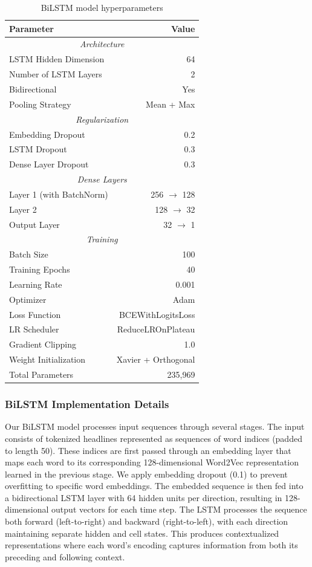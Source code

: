 \documentclass[11pt]{article}
\begin{document}
\begin{table}[h]
\centering
\begin{tabular}{lr}
\toprule
\textbf{Parameter} & \textbf{Value} \\
\midrule
\multicolumn{2}{c}{\textit{Architecture}} \\
LSTM Hidden Dimension & 64 \\
Number of LSTM Layers & 2 \\
Bidirectional & Yes \\
Pooling Strategy & Mean + Max \\
\midrule
\multicolumn{2}{c}{\textit{Regularization}} \\
Embedding Dropout & 0.2 \\
LSTM Dropout & 0.3 \\
Dense Layer Dropout & 0.3 \\
\midrule
\multicolumn{2}{c}{\textit{Dense Layers}} \\
Layer 1 (with BatchNorm) & 256 $\rightarrow$ 128 \\
Layer 2 & 128 $\rightarrow$ 32 \\
Output Layer & 32 $\rightarrow$ 1 \\
\midrule
\multicolumn{2}{c}{\textit{Training}} \\
Batch Size & 100 \\
Training Epochs & 40 \\
Learning Rate & 0.001 \\
Optimizer & Adam \\
Loss Function & BCEWithLogitsLoss \\
LR Scheduler & ReduceLROnPlateau \\
Gradient Clipping & 1.0 \\
Weight Initialization & Xavier + Orthogonal \\
\midrule
Total Parameters & 235,969 \\
\bottomrule
\end{tabular}
\caption{BiLSTM model hyperparameters}
\label{tab:model_params}
\end{table}

\subsubsection{BiLSTM Implementation Details}

Our BiLSTM model processes input sequences through several stages. The input consists of tokenized headlines represented as sequences of word indices (padded to length 50). These indices are first passed through an embedding layer that maps each word to its corresponding 128-dimensional Word2Vec representation learned in the previous stage. We apply embedding dropout (0.1) to prevent overfitting to specific word embeddings. The embedded sequence is then fed into a bidirectional LSTM layer with 64 hidden units per direction, resulting in 128-dimensional output vectors for each time step. The LSTM processes the sequence both forward (left-to-right) and backward (right-to-left), with each direction maintaining separate hidden and cell states. This produces contextualized representations where each word's encoding captures information from both its preceding and following context.
\end{document}

